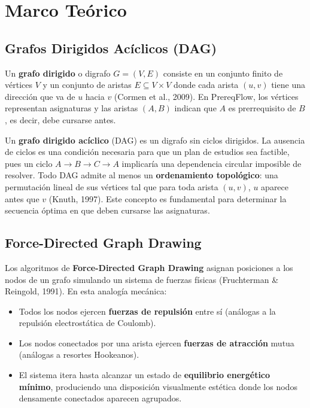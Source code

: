\documentclass[12pt]{report}
\begin{document}
\chapter{Marco Teórico}

\section{Grafos Dirigidos Acíclicos (DAG)}

Un \textbf{grafo dirigido} o digrafo $G = (V, E)$ consiste en un conjunto finito de vértices $V$ y un conjunto de aristas $E \subseteq V \times V$ donde cada arista $(u, v)$ tiene una dirección que va de $u$ hacia $v$ (Cormen et al., 2009). En PrereqFlow, los vértices representan asignaturas y las aristas $(A, B)$ indican que $A$ es prerrequisito de $B$, es decir, debe cursarse antes.

Un \textbf{grafo dirigido acíclico} (DAG) es un digrafo sin ciclos dirigidos. La ausencia de ciclos es una condición necesaria para que un plan de estudios sea factible, pues un ciclo $A \to B \to C \to A$ implicaría una dependencia circular imposible de resolver. Todo DAG admite al menos un \textbf{ordenamiento topológico}: una permutación lineal de sus vértices tal que para toda arista $(u, v)$, $u$ aparece antes que $v$ (Knuth, 1997). Este concepto es fundamental para determinar la secuencia óptima en que deben cursarse las asignaturas.

\section{Force-Directed Graph Drawing}

Los algoritmos de \textbf{Force-Directed Graph Drawing} asignan posiciones a los nodos de un grafo simulando un sistema de fuerzas físicas (Fruchterman \& Reingold, 1991). En esta analogía mecánica:
\begin{itemize}
    \item Todos los nodos ejercen \textbf{fuerzas de repulsión} entre sí (análogas a la repulsión electrostática de Coulomb).
    \item Los nodos conectados por una arista ejercen \textbf{fuerzas de atracción} mutua (análogas a resortes Hookeanos).
    \item El sistema itera hasta alcanzar un estado de \textbf{equilibrio energético mínimo}, produciendo una disposición visualmente estética donde los nodos densamente conectados aparecen agrupados.
\end{itemize}
\end{document}
